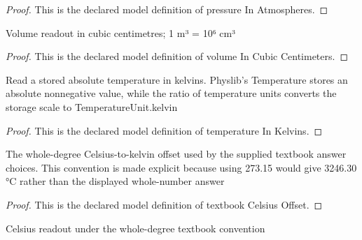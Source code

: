 \begin{proof}
  This is the declared model definition of pressure In Atmospheres.
\end{proof}
\begin{definition}
  \label{def:physics:phyx-mini-0362:phyxminiproblems-problemphyxmini0362-volumeincubiccentimeters}
  Volume readout in cubic centimetres; 1 m³ = 10⁶ cm³
\end{definition}
\begin{proof}
  This is the declared model definition of volume In Cubic Centimeters.
\end{proof}
\begin{definition}
  \label{def:physics:phyx-mini-0362:phyxminiproblems-problemphyxmini0362-temperatureinkelvins}
  Read a stored absolute temperature in kelvins. Physlib's Temperature stores an absolute nonnegative value, while the ratio of temperature units converts the storage scale to TemperatureUnit.kelvin
\end{definition}
\begin{proof}
  This is the declared model definition of temperature In Kelvins.
\end{proof}
\begin{definition}
  \label{def:physics:phyx-mini-0362:phyxminiproblems-problemphyxmini0362-textbookcelsiusoffset}
  The whole-degree Celsius-to-kelvin offset used by the supplied textbook answer choices. This convention is made explicit because using 273.15 would give 3246.30 °C rather than the displayed whole-number answer
\end{definition}
\begin{proof}
  This is the declared model definition of textbook Celsius Offset.
\end{proof}
\begin{definition}
  \label{def:physics:phyx-mini-0362:phyxminiproblems-problemphyxmini0362-temperatureindegreescelsius}
  Celsius readout under the whole-degree textbook convention
\end{definition}
